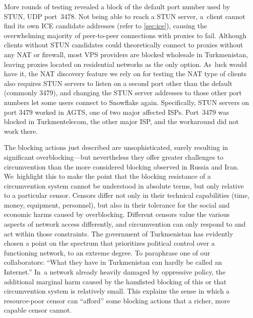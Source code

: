 \documentclass[letterpaper,twocolumn]{article}
\begin{document}
More rounds of testing revealed a block of the default port number
used by STUN, UDP port~3478.
Not being able to reach a STUN server,
a~client cannot find its own ICE candidate addresses
(refer to \autoref{sec:ice}),
causing the overwhelming majority of peer-to-peer connections with proxies to fail.
Although clients without STUN candidates could theoretically connect
to proxies without any NAT or firewall, most VPS providers are blocked
wholesale in Turkmenistan, leaving proxies located on residential networks
as the only option.
As~luck would have it, the NAT discovery feature we rely on
for testing the NAT type of clients also requires
STUN servers to listen on a second port other than the default~\cite[\S 6]{rfc5780}
(commonly 3479),
and changing the STUN server addresses to those other port numbers
let some users connect to Snowflake again.
Specifically, STUN servers on port 3479 worked in AGTS,
one of two major affected ISPs.
Port~3479 was blocked in Turkmentelecom, the other major ISP,
and the workaround did not work there.


The blocking actions just described are unsophisticated,
surely resulting in significant overblocking---but
nevertheless they offer greater challenges to circumvention
than the more considered blocking observed in Russia and Iran.
We~highlight this to make the point that the blocking resistance
of a circumvention system cannot be understood in absolute terms,
but only relative to a particular censor.
Censors differ not only in their technical capabilities
(time, money, equipment, personnel),
but also in their tolerance for the social and economic harms caused by overblocking.
Different censors value the various aspects of network access differently,
and circumvention can only respond to and act within those constraints.
The government of Turkmenistan has evidently chosen
a point on the spectrum that prioritizes political control
over a functioning network, to an extreme degree.
To paraphrase one of our collaborators:
``What they have in Turkmenistan can hardly be called an Internet.''
In~a network already heavily damaged by oppressive policy,
the additional marginal harm caused by the hamfisted blocking
of this or that circumvention system is relatively small.
This explains the sense in which a resource-poor censor
can ``afford'' some blocking actions
that a richer, more capable censor cannot.
\end{document}
